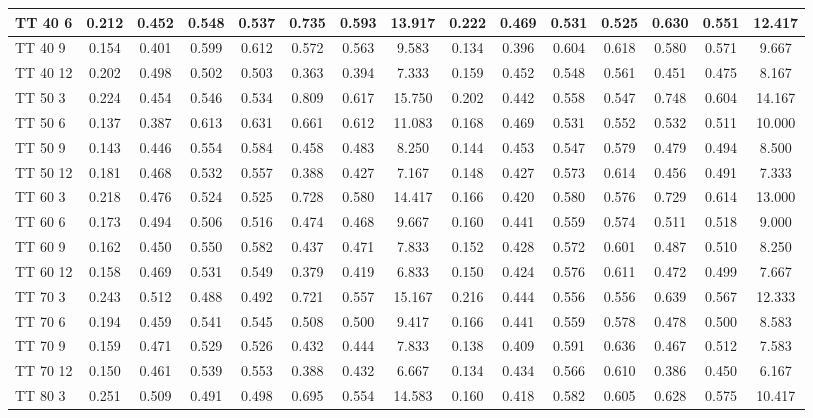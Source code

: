 \documentclass{article}
\begin{document}
\begin{longtable}[c]{|l|c|c|c|c|c|c|c||c|c|c|c|c|c|c|}
TT 40  6 & 0.212 & 0.452 & 0.548 & 0.537 & 0.735 & 0.593 & 13.917 & 0.222 & 0.469 & 0.531 & 0.525 & 0.630 & 0.551 & 12.417\\ \hline
TT 40  9 & 0.154 & 0.401 & 0.599 & 0.612 & 0.572 & 0.563 & 9.583 & 0.134 & 0.396 & 0.604 & 0.618 & 0.580 & 0.571 & 9.667\\ \hline
TT 40 12 & 0.202 & 0.498 & 0.502 & 0.503 & 0.363 & 0.394 & 7.333 & 0.159 & 0.452 & 0.548 & 0.561 & 0.451 & 0.475 & 8.167\\ \hline
TT 50  3 & 0.224 & 0.454 & 0.546 & 0.534 & 0.809 & 0.617 & 15.750 & 0.202 & 0.442 & 0.558 & 0.547 & 0.748 & 0.604 & 14.167\\ \hline
TT 50  6 & 0.137 & 0.387 & 0.613 & 0.631 & 0.661 & 0.612 & 11.083 & 0.168 & 0.469 & 0.531 & 0.552 & 0.532 & 0.511 & 10.000\\ \hline
TT 50  9 & 0.143 & 0.446 & 0.554 & 0.584 & 0.458 & 0.483 & 8.250 & 0.144 & 0.453 & 0.547 & 0.579 & 0.479 & 0.494 & 8.500\\ \hline
TT 50 12 & 0.181 & 0.468 & 0.532 & 0.557 & 0.388 & 0.427 & 7.167 & 0.148 & 0.427 & 0.573 & 0.614 & 0.456 & 0.491 & 7.333\\ \hline
TT 60  3 & 0.218 & 0.476 & 0.524 & 0.525 & 0.728 & 0.580 & 14.417 & 0.166 & 0.420 & 0.580 & 0.576 & 0.729 & 0.614 & 13.000\\ \hline
TT 60  6 & 0.173 & 0.494 & 0.506 & 0.516 & 0.474 & 0.468 & 9.667 & 0.160 & 0.441 & 0.559 & 0.574 & 0.511 & 0.518 & 9.000\\ \hline
TT 60  9 & 0.162 & 0.450 & 0.550 & 0.582 & 0.437 & 0.471 & 7.833 & 0.152 & 0.428 & 0.572 & 0.601 & 0.487 & 0.510 & 8.250\\ \hline
TT 60 12 & 0.158 & 0.469 & 0.531 & 0.549 & 0.379 & 0.419 & 6.833 & 0.150 & 0.424 & 0.576 & 0.611 & 0.472 & 0.499 & 7.667\\ \hline
TT 70  3 & 0.243 & 0.512 & 0.488 & 0.492 & 0.721 & 0.557 & 15.167 & 0.216 & 0.444 & 0.556 & 0.556 & 0.639 & 0.567 & 12.333\\ \hline
TT 70  6 & 0.194 & 0.459 & 0.541 & 0.545 & 0.508 & 0.500 & 9.417 & 0.166 & 0.441 & 0.559 & 0.578 & 0.478 & 0.500 & 8.583\\ \hline
TT 70  9 & 0.159 & 0.471 & 0.529 & 0.526 & 0.432 & 0.444 & 7.833 & 0.138 & 0.409 & 0.591 & 0.636 & 0.467 & 0.512 & 7.583\\ \hline
TT 70 12 & 0.150 & 0.461 & 0.539 & 0.553 & 0.388 & 0.432 & 6.667 & 0.134 & 0.434 & 0.566 & 0.610 & 0.386 & 0.450 & 6.167\\ \hline
TT 80  3 & 0.251 & 0.509 & 0.491 & 0.498 & 0.695 & 0.554 & 14.583 & 0.160 & 0.418 & 0.582 & 0.605 & 0.628 & 0.575 & 10.417\\ \hline

\end{longtable}
\end{document}
